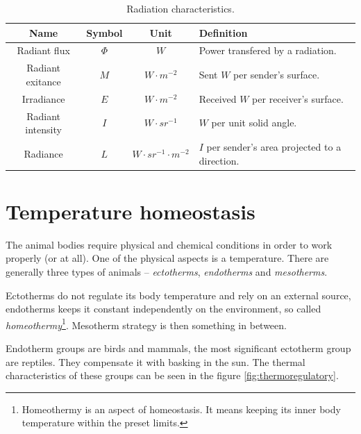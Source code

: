 \begin{table}
\begin{tabular}{|c|c|c|l|} \hline
\textbf{Name}             & \textbf{Symbol} & \textbf{Unit}                 & \textbf{Definition}                             \\ \hline
Radiant flux        & $\Phi$          & $W$                           & Power transfered by a radiation.                \\ \hline
Radiant exitance    & $M$             & $W\cdot m^{-2}$               & Sent $W$ per sender's surface.                  \\ \hline 
Irradiance          & $E$             & $W\cdot m^{-2}$               & Received $W$ per receiver's surface.            \\ \hline
Radiant intensity   & $I$             & $W\cdot sr^{-1}$              & $W$ per unit solid angle.                       \\ \hline
Radiance            & $L$             & $W\cdot sr^{-1}\cdot m^{-2}$  & $I$ per sender's area projected to a direction. \\ \hline
\end{tabular}
\caption{Radiation characteristics.\label{table:units} \cite{TemperatureMeasuring}}
\end{table}



\newpage
\section{Temperature homeostasis}
The animal bodies require physical and chemical conditions in order to work properly (or at all). One of
the physical aspects is a temperature. There are generally three types of animals -- {\it ectotherms},
{\it endotherms} and {\it mesotherms}.

Ectotherms do not regulate its body temperature and rely on an external source, endotherms keeps it
constant independently on the environment, so called {\it homeothermy}\footnote{Homeothermy is an aspect
of homeostasis. It means keeping its inner body temperature within the preset limits.}. Mesotherm
strategy is then something in between.

Endotherm groups are birds and mammals, the most significant ectotherm group are reptiles. They compensate
it with basking in the sun. The thermal characteristics of these groups can be seen in the figure \ref{fig:thermoregulatory}.

